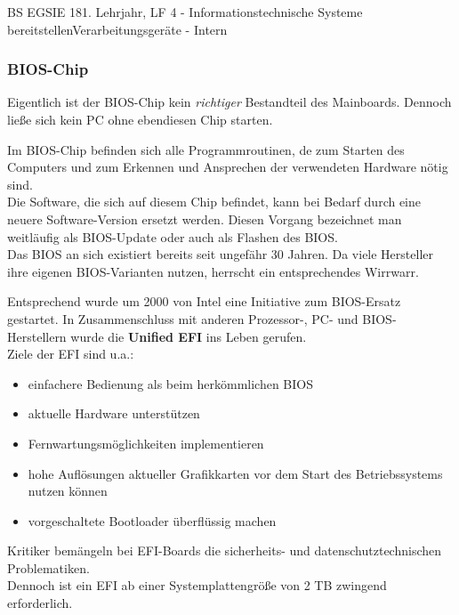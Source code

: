 \documentclass[oneside,openany,headings=optiontotoc,11pt,numbers=noenddot]{article}
\begin{document}
\begin{worksheet}{BS EGSIE 18}{1. Lehrjahr, LF 4 - Informationstechnische Systeme bereitstellen}{Verarbeitungsgeräte - Intern}
		\subsubsection*{BIOS-Chip}
		\footnotesize{}Eigentlich ist der BIOS-Chip kein \textit{richtiger} Bestandteil des Mainboards. Dennoch ließe sich kein PC ohne ebendiesen Chip starten.\normalsize\\
		\par\noindent
		Im BIOS-Chip befinden sich alle Programmroutinen, de zum Starten des Computers und zum Erkennen und Ansprechen der verwendeten Hardware nötig sind.\\
		Die Software, die sich auf diesem Chip befindet, kann bei Bedarf durch eine neuere Software-Version ersetzt werden. Diesen Vorgang bezeichnet man weitläufig als BIOS-Update oder auch als \glqq{}Flashen\grqq{} des BIOS.\\
		Das BIOS an sich existiert bereits seit ungefähr 30 Jahren. Da viele Hersteller ihre eigenen BIOS-Varianten nutzen, herrscht ein entsprechendes \glqq{}Wirrwarr\grqq{}.\\		
		\par\noindent
		Entsprechend wurde um 2000 von Intel eine Initiative zum \glqq{}BIOS-Ersatz\grqq{} gestartet. In Zusammenschluss mit anderen Prozessor-, PC- und BIOS-Herstellern wurde die \textbf{Unified EFI} ins Leben gerufen.\\
		Ziele der EFI sind u.a.:
		\begin{itemize}[label=-]
			\item einfachere Bedienung 	als beim herkömmlichen BIOS
			\item aktuelle Hardware unterstützen
			\item Fernwartungsmöglichkeiten implementieren
			\item hohe Auflösungen aktueller Grafikkarten vor dem Start des Betriebssystems nutzen können
			\item vorgeschaltete Bootloader überflüssig machen
		\end{itemize}
		Kritiker bemängeln bei EFI-Boards die sicherheits- und datenschutztechnischen Problematiken.\\
		Dennoch ist ein EFI ab einer Systemplattengröße von 2 TB zwingend erforderlich.

\end{worksheet}
\end{document}
